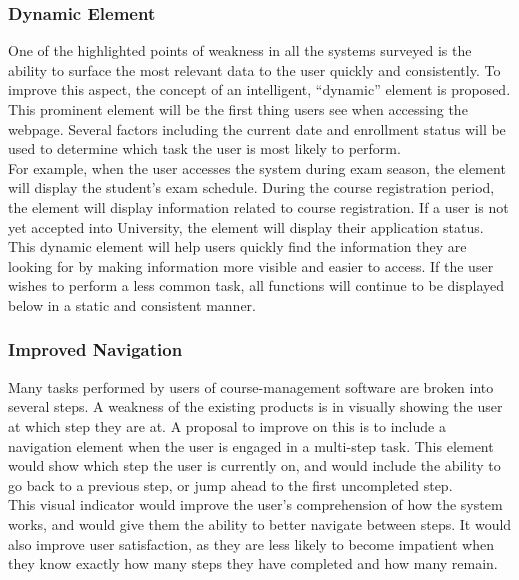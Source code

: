\documentclass[10pt]{article}
\begin{document}
\begin{multicols}{2}
\subsubsection*{Dynamic Element}
One of the highlighted points of weakness in all the systems surveyed is the 
ability to surface the most relevant data to the user quickly and consistently. 
To improve this aspect, the concept of an intelligent, ``dynamic'' element is 
proposed. This prominent element will be the first thing users see when 
accessing the webpage. Several factors including the current date and enrollment 
status will be used to determine which task the user is most likely to perform.
\\

For example, when the user accesses the system during exam season, the element 
will display the student's exam schedule. During the course registration period, 
the element will display information related to course registration. If a user 
is not yet accepted into University, the element will display their application 
status.\\

This dynamic element will help users quickly find the information they are 
looking for by making information more visible and easier to access. If the user 
wishes to perform a less common task, all functions will continue to be 
displayed below in a static and consistent manner.\\

\subsubsection*{Improved Navigation}
Many tasks performed by users of course-management software are broken into 
several steps. A weakness of the existing products is in visually showing the 
user at which step they are at. A proposal to improve on this is to include a 
navigation element when the user is engaged in a multi-step task. This element 
would show which step the user is currently on, and would include the ability to 
go back to a previous step, or jump ahead to the first uncompleted step.\\

This visual indicator would improve the user's comprehension of how the system 
works, and would give them the ability to better navigate between steps. It 
would also improve user satisfaction, as they are less likely to become 
impatient when they know exactly how many steps they have completed and how many 
remain. 


\end{multicols}
\end{document}
